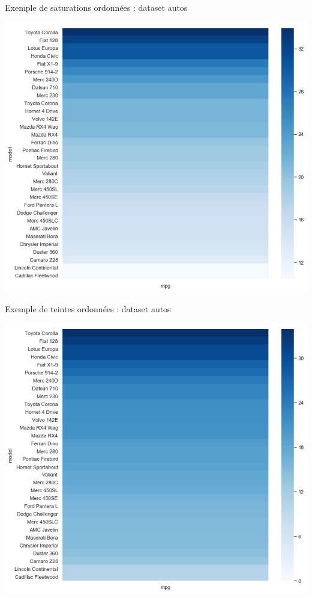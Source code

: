 \documentclass[french]{beamer}
\begin{document}
\begin{frame}{Exemple de saturations ordonnées : dataset autos}
\begin{center}
	\includegraphics[height=0.8\textheight]{autossat_order}
\end{center}
\end{frame}

\begin{frame}{Exemple de teintes ordonnées : dataset autos}
\begin{center}
	\includegraphics[height=0.8\textheight]{autossat_zero}
\end{center}
\end{frame}
\end{document}
